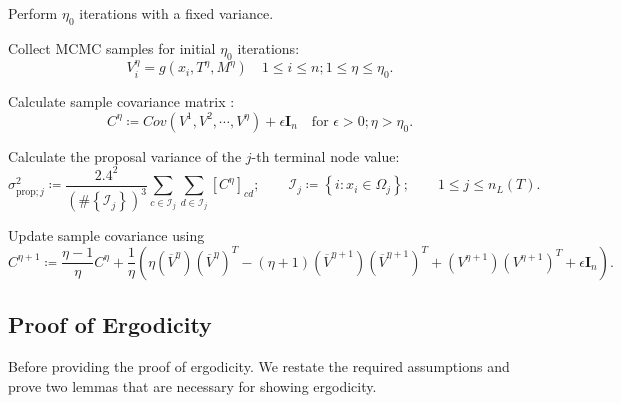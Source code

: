 \documentclass[
12pt]{article}
\begin{document}
	\begin{algorithm}[h]
		\caption{Computation of adaptive proposal}\label{alg:ada:prop}
		\begin{algorithmic}[1]
			\State Perform $\eta_0$ iterations with a fixed variance.
			
			\State Collect MCMC samples for initial $\eta_0$ iterations:
			\begin{equation*}
				V_{i}^{\eta} = g\left(x_i,T^{\eta},M^{\eta}\right)\quad 1\le i \le n; 1\le \eta \le \eta_0.
			\end{equation*}
			
			\State Calculate sample covariance matrix :
			\begin{equation*}
				C^{\eta} \coloneqq Cov\left(V^{1},V^{2},\cdots,V^{\eta}\right) + \epsilon\mathbf{I}_n \quad \text{for } \epsilon>0; \eta>\eta_0.
			\end{equation*}
			
			\State Calculate the proposal variance of the $j$-th terminal node value:
			\begin{equation*}
				\sigma_{\text{prop};j}^2 \coloneqq \frac{2.4^2}{\left(\#\left\{\mathcal{I}_{j}\right\}\right)^3}
				\sum_{c\in\mathcal{I}_{j}}\sum_{d\in\mathcal{I}_{j}}\left[C^{\eta}\right]_{cd};\qquad\mathcal{I}_{j}\coloneqq \left\{i:x_i\in \Omega_{j}\right\};\qquad 1\le j\le n_L(T).
			\end{equation*}
			
			\State Update sample covariance using 
			\begin{equation*}
				C^{\eta+1} \coloneqq 
				\frac{\eta-1}{\eta} C^{\eta} 
				+ \frac{1}{\eta}\left(\eta 
				\left(\overline{V}^{\eta}\right)\left(\overline{V}^{\eta}\right)^T 
				- (\eta+1)\left(\overline{V}^{\eta+1}\right)\left(\overline{V}^{\eta+1}\right)^T 
				+ \left({V}^{\eta+1}\right)\left({V}^{\eta+1}\right)^T + \epsilon\mathbf{I}_n\right).
			\end{equation*}
		\end{algorithmic}
	\end{algorithm}
	
	
	
	\subsection{Proof of Ergodicity}
	
	Before providing the proof of ergodicity. We restate the required assumptions and prove two lemmas that are necessary for showing ergodicity.
	
\end{document}
